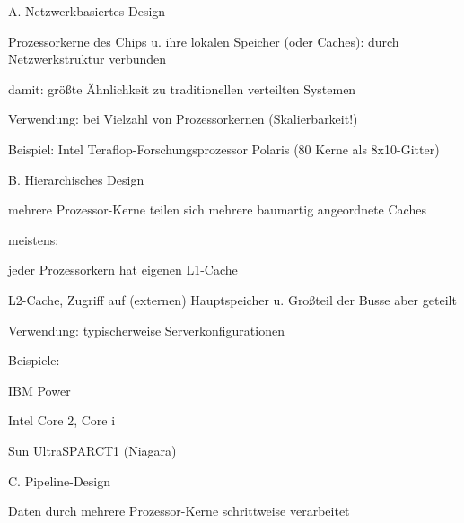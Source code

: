 \documentclass[a4paper]{article}
\begin{document}
\begin{multicols}{3}
    \begin{itemize*}
        \item
        A. Netzwerkbasiertes Design
        \begin{itemize*}
            \item Prozessorkerne des Chips u. ihre lokalen Speicher (oder Caches): durch Netzwerkstruktur verbunden
            \item damit: größte Ähnlichkeit zu traditionellen verteilten Systemen
            \item Verwendung: bei Vielzahl von Prozessorkernen (Skalierbarkeit!)
            \item Beispiel: Intel Teraflop-Forschungsprozessor Polaris (80 Kerne als 8x10-Gitter)
        \end{itemize*}
        \item
        B. Hierarchisches Design
        \begin{itemize*}
            \item mehrere Prozessor-Kerne teilen sich mehrere baumartig angeordnete Caches
            \item meistens: \begin{itemize*} \item jeder Prozessorkern hat eigenen L1-Cache \item L2-Cache, Zugriff auf (externen) Hauptspeicher u. Großteil der Busse aber geteilt \end{itemize*}
            \item Verwendung: typischerweise Serverkonfigurationen
            \item Beispiele: \begin{itemize*} \item IBM Power \item Intel Core 2, Core i \item Sun UltraSPARCT1 (Niagara) \end{itemize*}
        \end{itemize*}
        \item
        C. Pipeline-Design
        \begin{itemize*}
            \item Daten durch mehrere Prozessor-Kerne schrittweise verarbeitet

\end{itemize*}
\end{itemize*}
\end{multicols}
\end{document}

